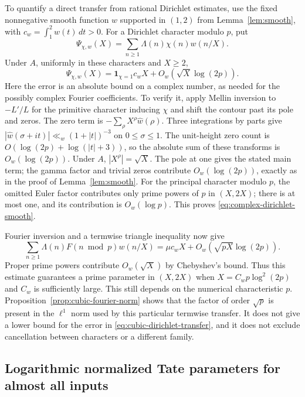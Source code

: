 \documentclass[11pt]{article}
\theoremstyle{definition}
\theoremstyle{remark}
\begin{document}
To quantify a direct transfer from rational Dirichlet estimates, use the
fixed nonnegative smooth function $w$ supported in $(1,2)$ from
Lemma~\ref{lem:smooth}, with $c_w=\int_1^2w(t)\,dt>0$.
For a Dirichlet character modulo $p$, put
\[
 \Psi_{\chi,w}(X)=\sum_{n\ge1}\Lambda(n)\chi(n)w(n/X).
\]
Under $A$, uniformly in these characters and $X\ge2$,
\begin{equation}\label{eq:complex-dirichlet-smooth}
 \Psi_{\chi,w}(X)=\boldsymbol1_{\chi=1}c_wX
       +O_w\!\left(\sqrt X\log(2p)\right).
\end{equation}
Here the error is an absolute bound on a complex number, as needed
for the possibly complex Fourier coefficients. To verify it, apply
Mellin inversion to $-L'/L$ for the primitive character inducing
$\chi$ and shift the contour past its pole and zeros. The zero term is
$-\sum_\rho X^\rho\widehat w(\rho)$. Three integrations by parts
give $|\widehat w(\sigma+it)|\ll_w(1+|t|)^{-3}$ on
$0\le\sigma\le1$. The unit-height zero count is
$O(\log(2p)+\log(|t|+3))$, so the absolute sum of these transforms
is $O_w(\log(2p))$. Under $A$, $|X^\rho|=\sqrt X$.
The pole at one gives the stated main term; the gamma factor and
trivial zeros contribute $O_w(\log(2p))$, exactly as in the proof
of Lemma~\ref{lem:smooth}. For the principal character modulo $p$,
the omitted Euler factor contributes only prime powers of $p$ in
$(X,2X)$; there is at most one, and its contribution is
$O_w(\log p)$. This proves \eqref{eq:complex-dirichlet-smooth}.

Fourier inversion and a termwise triangle inequality now give
\begin{equation}\label{eq:cubic-dirichlet-transfer}
 \sum_{n\ge1}\Lambda(n)F(n\bmod p)w(n/X)
   =\mu c_wX+O_w\!\left(\sqrt{pX}\log(2p)\right).
\end{equation}
Proper prime powers contribute $O_w(\sqrt X)$ by Chebyshev's
bound. Thus this estimate guarantees a prime parameter in $(X,2X)$
when $X=C_w p\log^2(2p)$ and $C_w$ is sufficiently large.
This still depends on the numerical characteristic $p$.
Proposition~\ref{prop:cubic-fourier-norm} shows that the factor
of order $\sqrt p$ is present in the $\ell^1$ norm used by this
particular termwise transfer. It does not give a lower bound for
the error in \eqref{eq:cubic-dirichlet-transfer}, and it does not
exclude cancellation between characters or a different family.


\subsection{Logarithmic normalized Tate parameters for almost all inputs}
\end{document}
